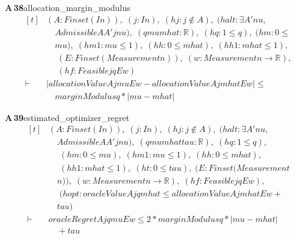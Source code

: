 \documentclass[conference]{IEEEtran}
\theoremstyle{definition}
\newcommand{\lean}[1]{\textsf{\footnotesize #1}}
\begin{document}
\noindent\textbf{A\,38}\quad\lean{allocation\_margin\_modulus}
{\footnotesize\[ \begin{aligned}[t]
&(\mathit{A} : \mathit{Finset} (\mathit{I} \mathit{n})),\; (\mathit{j} : \mathit{I} \mathit{n}),\; (\mathit{hj} : \mathit{j} \notin \mathit{A}),\; (\mathit{halt} : \exists \mathit{A'} \mathit{nu},\\
&\quad \mathit{Admissible} \mathit{A} \mathit{A'} \mathit{j} \mathit{nu}),\; (\mathit{q} \mathit{mu} \mathit{mhat} : \mathbb{R} ),\; (\mathit{hq} : 1 \leq \mathit{q}),\; (\mathit{hm} : 0 \leq\\
&\quad \mathit{mu}),\; (\mathit{hm1} : \mathit{mu} \leq 1),\; (\mathit{hh} : 0 \leq \mathit{mhat}),\; (\mathit{hh1} : \mathit{mhat} \leq 1),\\
&\quad \; (\mathit{E} : \mathit{Finset} (\mathit{Measurement} \mathit{n})),\; (\mathit{w} : \mathit{Measurement} \mathit{n} \to \mathbb{R} ),\\
&\quad \; (\mathit{hf} : \mathit{Feasible} \mathit{j} \mathit{q} \mathit{E} \mathit{w})\\
\vdash\;&|\mathit{allocationValue} \mathit{A} \mathit{j} \mathit{mu} \mathit{E} \mathit{w}-\mathit{allocationValue} \mathit{A} \mathit{j} \mathit{mhat} \mathit{E} \mathit{w}| \leq\\
&\quad \mathit{marginModulus} \mathit{q}*|\mathit{mu}-\mathit{mhat}|
\end{aligned} \]}

\noindent\textbf{A\,39}\quad\lean{estimated\_optimizer\_regret}
{\footnotesize\[ \begin{aligned}[t]
&(\mathit{A} : \mathit{Finset} (\mathit{I} \mathit{n})),\; (\mathit{j} : \mathit{I} \mathit{n}),\; (\mathit{hj} : \mathit{j} \notin \mathit{A}),\; (\mathit{halt} : \exists \mathit{A'} \mathit{nu},\\
&\quad \mathit{Admissible} \mathit{A} \mathit{A'} \mathit{j} \mathit{nu}),\; (\mathit{q} \mathit{mu} \mathit{mhat} \mathit{tau} : \mathbb{R} ),\; (\mathit{hq} : 1 \leq \mathit{q}),\\
&\quad \; (\mathit{hm} : 0 \leq \mathit{mu}),\; (\mathit{hm1} : \mathit{mu} \leq 1),\; (\mathit{hh} : 0 \leq \mathit{mhat}),\\
&\quad \; (\mathit{hh1} : \mathit{mhat} \leq 1),\; (\mathit{ht} : 0 \leq \mathit{tau}),\; (\mathit{E} : \mathit{Finset} (\mathit{Measurement}\\
&\quad \mathit{n})),\; (\mathit{w} : \mathit{Measurement} \mathit{n} \to \mathbb{R} ),\; (\mathit{hf} : \mathit{Feasible} \mathit{j} \mathit{q} \mathit{E} \mathit{w}),\\
&\quad \; (\mathit{hopt} : \mathit{oracleValue} \mathit{A} \mathit{j} \mathit{q} \mathit{mhat} \leq \mathit{allocationValue} \mathit{A} \mathit{j} \mathit{mhat} \mathit{E} \mathit{w}+\\
&\quad \mathit{tau})\\
\vdash\;&\mathit{oracleRegret} \mathit{A} \mathit{j} \mathit{q} \mathit{mu} \mathit{E} \mathit{w} \leq 2*\mathit{marginModulus} \mathit{q}*|\mathit{mu}-\mathit{mhat}|\\
&\quad +\mathit{tau}
\end{aligned} \]}
\end{document}
